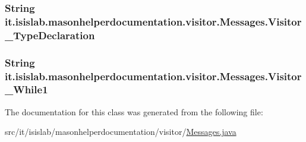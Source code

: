 \hypertarget{classit_1_1isislab_1_1masonhelperdocumentation_1_1visitor_1_1_messages_a0425f530629f22e0c518246f33aa225b}{
\subsubsection[{Visitor\-\_\-\-Type\-Declaration}]{\setlength{\rightskip}{0pt plus 5cm}String it.\-isislab.\-masonhelperdocumentation.\-visitor.\-Messages.\-Visitor\-\_\-\-Type\-Declaration\hspace{0.3cm}{\ttfamily [static]}}}\label{classit_1_1isislab_1_1masonhelperdocumentation_1_1visitor_1_1_messages_a0425f530629f22e0c518246f33aa225b}
\hypertarget{classit_1_1isislab_1_1masonhelperdocumentation_1_1visitor_1_1_messages_a8b52faa8e610a01ecd3f2dd5d43838b9}{
\subsubsection[{Visitor\-\_\-\-While1}]{\setlength{\rightskip}{0pt plus 5cm}String it.\-isislab.\-masonhelperdocumentation.\-visitor.\-Messages.\-Visitor\-\_\-\-While1\hspace{0.3cm}{\ttfamily [static]}}}\label{classit_1_1isislab_1_1masonhelperdocumentation_1_1visitor_1_1_messages_a8b52faa8e610a01ecd3f2dd5d43838b9}


The documentation for this class was generated from the following file\-:\begin{DoxyCompactItemize}
\item 
src/it/isislab/masonhelperdocumentation/visitor/\hyperlink{visitor_2_messages_8java}{Messages.\-java}\end{DoxyCompactItemize}
